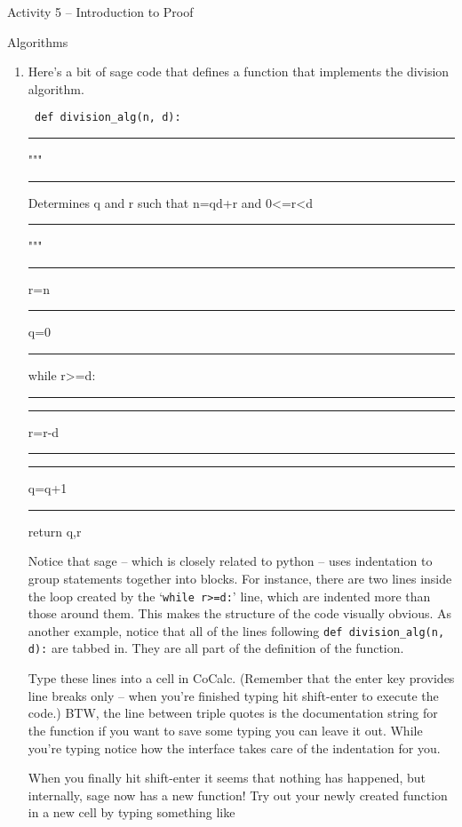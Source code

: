 \documentclass{amsart}
\begin{document}
\thispagestyle{empty}

\centerline{\Large Activity 5 -- Introduction to Proof}
\centerline{\large Algorithms}

\bigskip
\Large


\begin{enumerate}
\item Here's a bit of sage code that defines a function that implements the division algorithm.

\vspace{.2in}

\begin{minipage}[b]{.9\textwidth}
\tt 
def division\_alg(n, d):\\
\rule{4ex}{0pt}    """\\
\rule{4ex}{0pt}    Determines q and r such that n=qd+r and 0<=r<d\\
\rule{4ex}{0pt}    """\\
\rule{4ex}{0pt}    r=n\\
\rule{4ex}{0pt}    q=0\\
\rule{4ex}{0pt}   while r>=d:\\
\rule{4ex}{0pt} \rule{4ex}{0pt}        r=r-d\\
\rule{4ex}{0pt} \rule{4ex}{0pt}        q=q+1\\
\rule{4ex}{0pt}    return q,r\\
\end{minipage}

\vspace{.2in}

Notice that sage -- which is closely related to python -- uses indentation to group statements together into blocks.  For instance, there are two lines inside the loop created by the `{\tt while r>=d:}' line, which are indented more than those around them.  This makes the structure of the code visually obvious.  As another example, notice that all of the lines following {\tt def division\_alg(n, d):} are tabbed in.  They are all part of the definition of the function.  

Type these lines into a cell in CoCalc.  (Remember that the enter key provides line breaks only -- when you're finished typing hit shift-enter to execute the code.)  BTW, the line between triple quotes is the documentation string for the function if you want to save some typing you can leave it out.  While you're typing notice how the interface takes care of the indentation for you.

When you finally hit shift-enter it seems that nothing has happened, but internally, sage now has a new function!  Try out your newly created function in a new cell by typing something like


\end{enumerate}
\end{document}
